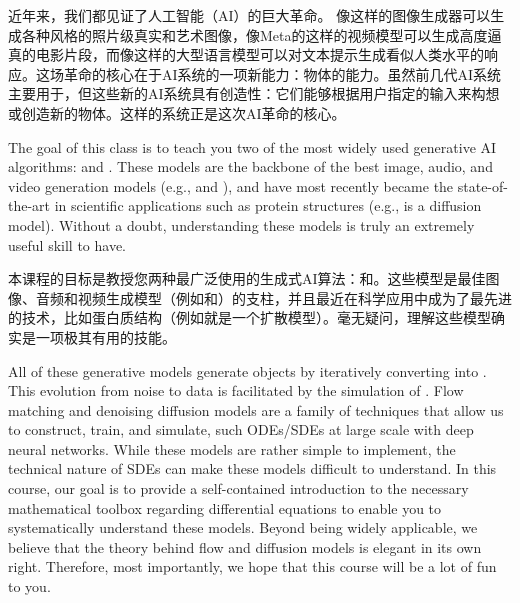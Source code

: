 近年来，我们都见证了人工智能（AI）的巨大革命。
像这样的图像生成器可以生成各种风格的照片级真实和艺术图像，像Meta的这样的视频模型可以生成高度逼真的电影片段，而像这样的大型语言模型可以对文本提示生成看似人类水平的响应。这场革命的核心在于AI系统的一项新能力：物体的能力。虽然前几代AI系统主要用于，但这些新的AI系统具有创造性：它们能够根据用户指定的输入来构想或创造新的物体。这样的系统正是这次AI革命的核心。  

The goal of this class is to teach you two of the most widely used generative AI algorithms:  \citep{song2020score} and  \citep{lipman2022flow,liu2022flow, albergo2023stochastic, lipman2024flow}. These models are the backbone of the best image, audio, and video generation models (e.g.,  and ), and have most recently became the state-of-the-art in scientific applications such as protein structures (e.g.,  is a diffusion model). Without a doubt, understanding these models is truly an extremely useful skill to have.

本课程的目标是教授您两种最广泛使用的生成式AI算法：\citep{song2020score}和\citep{lipman2022flow,liu2022flow, albergo2023stochastic, lipman2024flow}。这些模型是最佳图像、音频和视频生成模型（例如和）的支柱，并且最近在科学应用中成为了最先进的技术，比如蛋白质结构（例如就是一个扩散模型）。毫无疑问，理解这些模型确实是一项极其有用的技能。

All of these generative models generate objects by iteratively converting   into . This evolution from noise to data is facilitated by the simulation of . Flow matching and denoising diffusion models are a family of techniques that allow us to construct, train, and simulate, such ODEs/SDEs at large scale with deep neural networks. While these models are rather simple to implement, the technical nature of SDEs can make these models difficult to understand. In this course, our goal is to provide a self-contained introduction to the necessary mathematical toolbox regarding differential equations to enable you to systematically understand these models. Beyond being widely applicable, we believe that the theory behind flow and diffusion models is elegant in its own right. Therefore, most importantly, we hope that this course will be a lot of fun to you.

